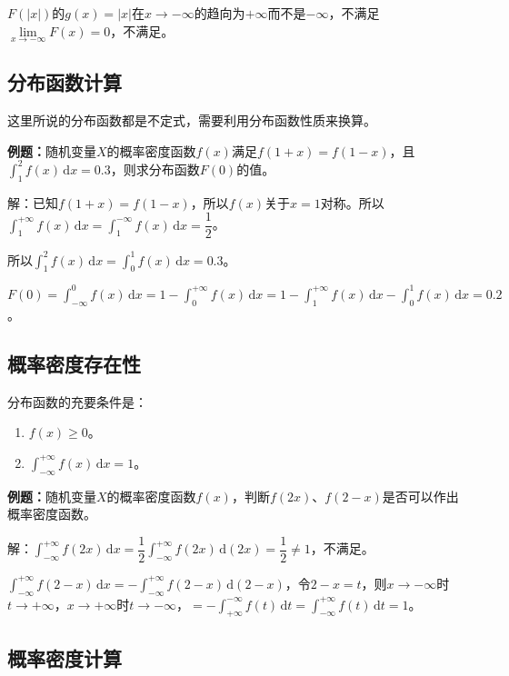 $F(\vert x\vert)$的$g(x)=\vert x\vert$在$x\to-\infty$的趋向为$+\infty$而不是$-\infty$，不满足$\lim\limits_{x\to-\infty}F(x)=0$，不满足。

\subsection{分布函数计算}

这里所说的分布函数都是不定式，需要利用分布函数性质来换算。

\textbf{例题：}随机变量$X$的概率密度函数$f(x)$满足$f(1+x)=f(1-x)$，且$\int_1^2f(x)\,\textrm{d}x=0.3$，则求分布函数$F(0)$的值。

解：已知$f(1+x)=f(1-x)$，所以$f(x)$关于$x=1$对称。所以$\int_1^{+\infty}f(x)\,\textrm{d}x=\int_1^{-\infty}f(x)\,\textrm{d}x=\dfrac{1}{2}$。

所以$\int_1^2f(x)\,\textrm{d}x=\int_0^1f(x)\,\textrm{d}x=0.3$。

$F(0)=\int_{-\infty}^0f(x)\,\textrm{d}x=1-\int_0^{+\infty}f(x)\,\textrm{d}x=1-\int_1^{+\infty}f(x)\,\textrm{d}x-\int_0^1f(x)\,\textrm{d}x=0.2$。

\subsection{概率密度存在性}

分布函数的充要条件是：

\begin{enumerate}
    \item $f(x)\geqslant0$。
    \item $\int_{-\infty}^{+\infty}f(x)\,\textrm{d}x=1$。
\end{enumerate}

\textbf{例题：}随机变量$X$的概率密度函数$f(x)$，判断$f(2x)$、$f(2-x)$是否可以作出概率密度函数。

解：$\int_{-\infty}^{+\infty}f(2x)\,\textrm{d}x=\dfrac{1}{2}\int_{-\infty}^{+\infty}f(2x)\,\textrm{d}(2x)=\dfrac{1}{2}\neq1$，不满足。

$\int_{-\infty}^{+\infty}f(2-x)\,\textrm{d}x=-\int_{-\infty}^{+\infty}f(2-x)\,\textrm{d}(2-x)$，令$2-x=t$，则$x\to-\infty$时$t\to+\infty$，$x\to+\infty$时$t\to-\infty$，$=-\int_{+\infty}^{-\infty}f(t)\,\textrm{d}t=\int_{-\infty}^{+\infty}f(t)\,\textrm{d}t=1$。

\subsection{概率密度计算}

